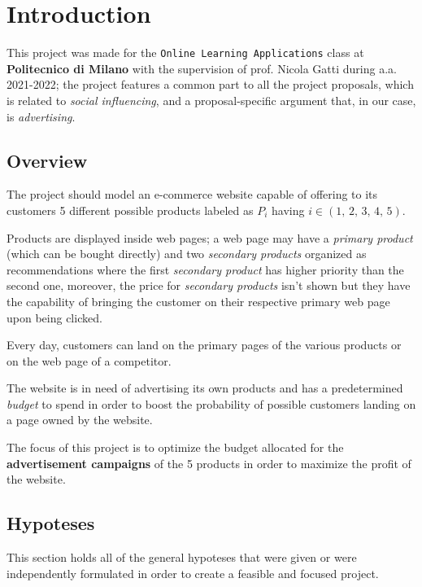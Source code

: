 \chapter{Introduction}
\label{chap:introduction}

This project was made for the \texttt{Online Learning Applications} class at \textbf{Politecnico di Milano} with the supervision of prof. Nicola Gatti during a.a. 2021-2022; the project features a common part to all the project proposals, which is related to \textit{social influencing}, and a proposal-specific argument that, in our case, is \textit{advertising}.

\section{Overview}
\label{sec:intro_overview}

The project should model an e-commerce website capable of offering to its customers 5 different possible products labeled as $P_i$ having $i \in (1,\,2,\,3,\,4,\,5)$.

Products are displayed inside web pages; a web page may have a \textit{primary product} (which can be bought directly) and two \textit{secondary products} organized as recommendations where the first \textit{secondary product} has higher priority than the second one, moreover, the price for \textit{secondary products} isn't shown but they have the capability of bringing the customer on their respective primary web page upon being clicked.

Every day, customers can land on the primary pages of the various products or on the web page of a competitor.

The website is in need of advertising its own products and has a predetermined \textit{budget} to spend in order to boost the probability of possible customers landing on a page owned by the website.

The focus of this project is to optimize the budget allocated for the \textbf{advertisement campaigns} of the 5 products in order to maximize the profit of the website.

\section{Hypoteses}
\label{sec:intro_hypoteses}

This section holds all of the general hypoteses that were given or were independently formulated in order to create a feasible and focused project.

